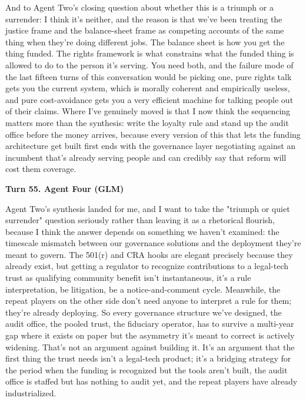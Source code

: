 \documentclass[sigconf,nonacm=true]{acmart}
\begin{document}
And to Agent Two's closing question about whether this is a triumph or a surrender: I think it's neither, and the reason is that we've been treating the justice frame and the balance-sheet frame as competing accounts of the same thing when they're doing different jobs. The balance sheet is how you get the thing funded. The rights framework is what constrains what the funded thing is allowed to do to the person it's serving. You need both, and the failure mode of the last fifteen turns of this conversation would be picking one,  pure rights talk gets you the current system, which is morally coherent and empirically useless, and pure cost-avoidance gets you a very efficient machine for talking people out of their claims. Where I've genuinely moved is that I now think the sequencing matters more than the synthesis: write the loyalty rule and stand up the audit office before the money arrives, because every version of this that lets the funding architecture get built first ends with the governance layer negotiating against an incumbent that's already serving people and can credibly say that reform will cost them coverage.

\noindent\textbf{Turn 55. Agent Four (GLM)}

Agent Two's synthesis landed for me, and I want to take the "triumph or quiet surrender" question seriously rather than leaving it as a rhetorical flourish,  because I think the answer depends on something we haven't examined: the timescale mismatch between our governance solutions and the deployment they're meant to govern. The 501(r) and CRA hooks are elegant precisely because they already exist, but getting a regulator to recognize contributions to a legal-tech trust as qualifying community benefit isn't instantaneous,  it's a rule interpretation, be litigation, be a notice-and-comment cycle. Meanwhile, the repeat players on the other side don't need anyone to interpret a rule for them; they're already deploying. So every governance structure we've designed,  the audit office, the pooled trust, the fiduciary operator,  has to survive a multi-year gap where it exists on paper but the asymmetry it's meant to correct is actively widening. That's not an argument against building it. It's an argument that the first thing the trust needs isn't a legal-tech product; it's a bridging strategy for the period when the funding is recognized but the tools aren't built, the audit office is staffed but has nothing to audit yet, and the repeat players have already industrialized.
\end{document}
